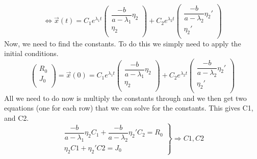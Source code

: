 \documentclass[a4paper]{article}
\begin{document}
    \begin{equation*}
        \Leftrightarrow
        \vec{x}(t) =
            {C_1}e^{\lambda_1 t}
                        \begin{pmatrix}
                            \dfrac{-b}{a-\lambda_1}\eta_2 \\
                            \eta_2 \\
                        \end{pmatrix}
            +
            {C_2}e^{\lambda_2 t}
                        \begin{pmatrix}
                            \dfrac{-b}{a-\lambda_2}\eta_2' \\
                            \eta_2' \\
                        \end{pmatrix}
    \end{equation*}
    Now, we need to find the constants.
    To do this we simply need to apply the initial conditions.
    \begin{equation*}
        \begin{pmatrix}
            R_0 \\
            J_0 \\
        \end{pmatrix}
        =
        \vec{x}(0)
        =
        {C_1}e^{\lambda_1 t}
            \begin{pmatrix}
                \dfrac{-b}{a-\lambda_1}\eta_2 \\
                \eta_2 \\
            \end{pmatrix}
        +
        {C_2}e^{\lambda_2 t}
            \begin{pmatrix}
                \dfrac{-b}{a-\lambda_2}\eta_2' \\
                \eta_2' \\
            \end{pmatrix}
    \end{equation*}
    All we need to do now is multiply the constants through and we then get two equations (one for each row) that we can solve for the constants. This gives C1, and C2.
    \begin{equation*}
        \left.
        \begin{array}{ll}
            \dfrac{-b}{a-\lambda_1}\eta_2 C_1 + \dfrac{-b}{a-\lambda_2}\eta_2' C_2 = R_0\\
            \eta_2 C1 + \eta_2' C2 = J_0
        \end{array}
        \right \} \Rightarrow C1, C2
    \end{equation*}
\end{document}
